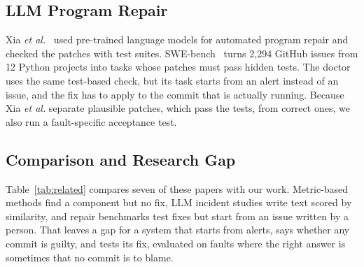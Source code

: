 \documentclass[12pt,onecolumn,draftclsnofoot]{IEEEtran}
\begin{document}
\subsection{LLM Program Repair}
Xia \emph{et al.}~\cite{xia2023apr} used pre-trained language models for automated program repair and checked the patches with test suites. SWE-bench~\cite{jimenez2024swebench} turns 2,294 GitHub issues from 12 Python projects into tasks whose patches must pass hidden tests. The doctor uses the same test-based check, but its task starts from an alert instead of an issue, and the fix has to apply to the commit that is actually running. Because Xia \emph{et al.} separate plausible patches, which pass the tests, from correct ones, we also run a fault-specific acceptance test.

\subsection{Comparison and Research Gap}
Table~\ref{tab:related} compares seven of these papers with our work. Metric-based methods find a component but no fix, LLM incident studies write text scored by similarity, and repair benchmarks test fixes but start from an issue written by a person. That leaves a gap for a system that starts from alerts, says whether any commit is guilty, and tests its fix, evaluated on faults where the right answer is sometimes that no commit is to blame.
\end{document}
